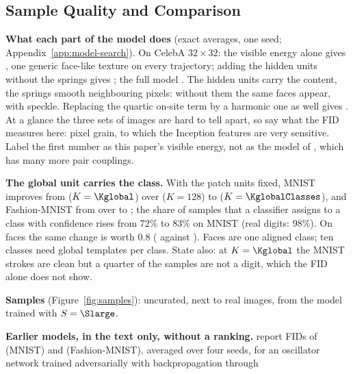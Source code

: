 \subsection{Sample Quality and Comparison}
\label{sec:quality}
\begin{plan}
  \item \textbf{What each part of the model does} (exact averages, one seed;
        Appendix~\ref{app:model-search}).
        On CelebA $32\times32$: the visible energy alone gives
        \FIDablPixelsOnly{}, one generic face-like texture on every
        trajectory; adding the hidden units without the springs gives
        \FIDablNoSprings; the full model \FIDcelebLowExact. The hidden units
        carry the content, the springs smooth neighbouring pixels: without
        them the same faces appear, with speckle. Replacing the quartic
        on-site term by a harmonic one as well gives \FIDablHarmonic. At a
        glance the three sets of images are hard to tell apart, so say what
        the FID measures here: pixel grain, to which the Inception features
        are very sensitive.
        Label the first number as this paper's visible energy, not as the model
        of \citet{firstpaper2025}, which has many more pair couplings.
  \item \textbf{The global unit carries the class.} With the patch units fixed,
        MNIST improves from \FIDmnistSmallK{} ($K=\Kglobal$) over
        \FIDmnistMidK{} ($K=128$) to \FIDmnistExact{} ($K=\KglobalClasses$),
        and Fashion-MNIST from \FIDfashionSmallK{} over \FIDfashionMidK{} to
        \FIDfashionExact; the share of samples that a classifier assigns to a
        class with confidence rises from 72\% to 83\% on MNIST (real digits:
        98\%). On faces the same change is worth 0.8
        (\FIDcelebLowLargeK{} against \FIDcelebLowExact). Faces are one aligned
        class; ten classes need global templates per class.
        State also: at $K=\Kglobal$ the MNIST strokes are clean but a quarter
        of the samples are not a digit, which the FID alone does not show.
  \item \textbf{Samples} (Figure~\ref{fig:samples}): uncurated, next to real
        images, from the model trained with $S=\Slarge$.
  \item \textbf{Earlier models, in the text only, without a ranking.}
        \citet{wangachour2026} report FIDs of \FIDwaMnist{} (MNIST) and
        \FIDwaFashion{} (Fashion-MNIST), averaged over four seeds, for an
        oscillator network trained adversarially with backpropagation through

\end{plan}
